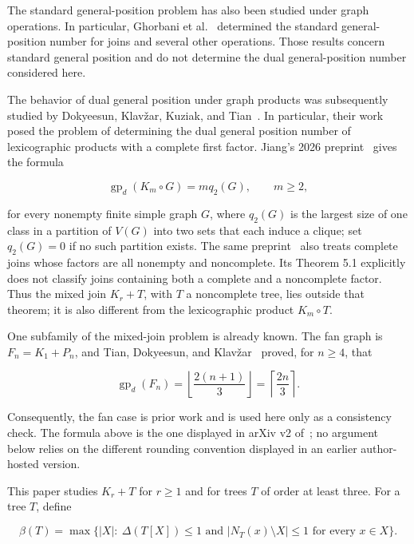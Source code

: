 \documentclass[11pt,a4paper]{article}
\numberwithin{equation}{section}
\begin{document}
The standard general-position problem has also been studied under graph
operations. In particular, Ghorbani et al.~\cite{ghorbani-et-al-operations}
determined the standard general-position number for joins and several
other operations. Those results concern standard general position and do
not determine the dual general-position number considered here.

The behavior of dual general position under graph products was
subsequently studied by Dokyeesun, Klav\v{z}ar, Kuziak, and Tian~\cite{dokyeesun-et-al-products}. In
particular, their work posed the problem of determining the dual general
position number of lexicographic products with a complete first factor.
Jiang's 2026 preprint~\cite[Theorem 3.2]{jiang-complete-first-factor} gives the formula

\[
\operatorname{gp}_d(K_m\circ G)=m q_2(G), \qquad m\ge 2,
\]

for every nonempty finite simple graph \(G\), where \(q_2(G)\) is the
largest size of one class in a partition of \(V(G)\) into two sets that
each induce a clique; set \(q_2(G)=0\) if no such partition exists. The
same preprint~\cite[Theorem 5.1]{jiang-complete-first-factor} also treats
complete joins whose factors are all nonempty and noncomplete. Its Theorem 5.1 explicitly
does not classify joins containing both a complete and a noncomplete
factor. Thus the mixed join \(K_r+T\), with \(T\) a noncomplete tree,
lies outside that theorem; it is also different from the lexicographic
product \(K_m\circ T\).

One subfamily of the mixed-join problem is already known. The fan graph
is \(F_n=K_1+P_n\), and Tian, Dokyeesun, and Klav\v{z}ar~\cite[arXiv v2]{tian-et-al-removal}
proved, for \(n\ge 4\), that

\nopagebreak[4]
\[
\operatorname{gp}_d(F_n)
=\left\lfloor\frac{2(n+1)}{3}\right\rfloor
=\left\lceil\frac{2n}{3}\right\rceil.
\]

Consequently, the fan case is prior work and is used here only as a
consistency check. The formula above is the one displayed in arXiv v2
of~\cite{tian-et-al-removal}; no argument below relies on the different
rounding convention displayed in an earlier author-hosted version.

This paper studies \(K_r+T\) for \(r\ge 1\) and for trees \(T\) of order
at least three. For a tree \(T\), define

\[
\beta(T)=\max\bigl\{|X|:\ \Delta(T[X])\le 1
\text{ and } |N_T(x)\setminus X|\le 1\text{ for every }x\in X\bigr\}.
\]
\end{document}
